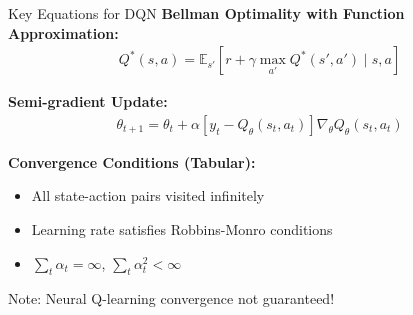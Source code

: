 \documentclass[aspectratio=169,10pt]{beamer}
\begin{document}
\begin{frame}{Key Equations for DQN}
\textbf{Bellman Optimality with Function Approximation:}
\begin{align}
Q^*(s,a) = \mathbb{E}_{s'} \left[ r + \gamma \max_{a'} Q^*(s',a') \mid s,a \right]
\end{align}

\textbf{Semi-gradient Update:}
\begin{align}
\theta_{t+1} = \theta_t + \alpha \left[ y_t - Q_\theta(s_t,a_t) \right] \nabla_\theta Q_\theta(s_t,a_t)
\end{align}

\textbf{Convergence Conditions (Tabular):}
\begin{itemize}
    \item All state-action pairs visited infinitely
    \item Learning rate satisfies Robbins-Monro conditions
    \item $\sum_t \alpha_t = \infty$, $\sum_t \alpha_t^2 < \infty$
\end{itemize}

\alert{Note: Neural Q-learning convergence not guaranteed!}
\end{frame}
\end{document}
